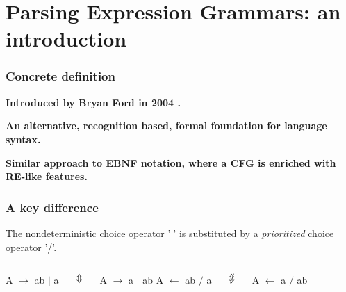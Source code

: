\section{Parsing Expression Grammars: an introduction}

\begin{frame}
	\frametitle{Concrete definition}
	\textbf{Introduced by Bryan Ford in 2004 \cite{peg}.}
	
   \textbf{An alternative, recognition based, formal foundation for language syntax.}
   
   \textbf{Similar approach to EBNF notation, where a CFG is enriched with RE-like  features.}
   
\end{frame}

\begin{frame}
	\frametitle{A key difference}
	\begin{minipage}{\textwidth}
		The nondeterministic choice operator  '$|$' is substituted by a \emph{prioritized} choice operator '/'. 
	\end{minipage}
\vfill
	\begin{minipage}{\textwidth}
	\begin{columns}
		\centering
		A  $\rightarrow$ ab $|$ a 
		
		$\Updownarrow$
		
		A $\rightarrow$ a $|$ ab
		\centering
		A  $\leftarrow$ ab $/$ a 
		
		$\not\Updownarrow$
		
		A $\leftarrow$ a $/$ ab
		
	\end{columns}
			

	\end{minipage}
\end{frame}

